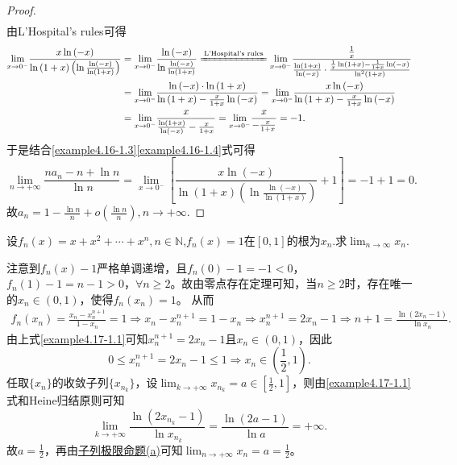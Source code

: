 \documentclass[../../main.tex]{subfiles}
\begin{document}
\begin{proof}
\begin{align}
\label{example4.16-1.3}
\end{align}
由L'Hospital's rules可得
\begin{align}
\underset{x\rightarrow 0^-}{\lim}\frac{x\ln \left( -x \right)}{\ln \left( 1+x \right) \left( \ln \frac{\ln \left( -x \right)}{\ln \left( 1+x \right)} \right)}&=\underset{x\rightarrow 0^-}{\lim}\frac{\ln \left( -x \right)}{\ln \frac{\ln \left( -x \right)}{\ln \left( 1+x \right)}}\xlongequal{\text{L'Hospital's rules}}\underset{x\rightarrow 0^-}{\lim}\frac{\frac{1}{x}}{\frac{\ln \left( 1+x \right)}{\ln \left( -x \right)}\cdot \frac{\frac{1}{x}\ln \left( 1+x \right) -\frac{1}{1+x}\ln \left( -x \right)}{\ln ^2\left( 1+x \right)}}\nonumber
\\
&=\underset{x\rightarrow 0^-}{\lim}\frac{\ln \left( -x \right) \cdot \ln \left( 1+x \right)}{\ln \left( 1+x \right) -\frac{x}{1+x}\ln \left( -x \right)}=\underset{x\rightarrow 0^-}{\lim}\frac{x\ln \left( -x \right)}{\ln \left( 1+x \right) -\frac{x}{1+x}\ln \left( -x \right)}\nonumber
\\
&=\underset{x\rightarrow 0^-}{\lim}\frac{x}{\frac{\ln \left( 1+x \right)}{\ln \left( -x \right)}-\frac{x}{1+x}}=\underset{x\rightarrow 0^-}{\lim}\frac{x}{-\frac{x}{1+x}}=-1.
\label{example4.16-1.4}
\end{align}
于是结合\eqref{example4.16-1.3}\eqref{example4.16-1.4}式可得
\[
\lim_{n\rightarrow +\infty}\frac{na_n - n + \ln n}{\ln n} = \lim_{x\rightarrow 0^-}\left[ \frac{x\ln(-x)}{\ln(1 + x)\left(\ln \frac{\ln(-x)}{\ln(1 + x)}\right)} + 1 \right] = -1 + 1 = 0.
\]
故\(a_n = 1 - \frac{\ln n}{n} + o\left(\frac{\ln n}{n}\right), n \rightarrow +\infty\).
\end{proof}

\begin{example}
设\(f_n(x)=x + x^2+\cdots+x^n,n\in\mathbb{N}\),\(f_n(x)=1\)在\([0,1]\)的根为\(x_n\).求\(\lim_{n\rightarrow\infty}x_n\).
\end{example}
\begin{solution}
注意到\(f_n(x) - 1\)严格单调递增，且\(f_n(0) - 1 = -1 < 0\)，\(f_n(1) - 1 = n - 1 > 0\)，\(\forall n\geqslant 2\)。故由零点存在定理可知，当\(n\geqslant 2\)时，存在唯一的\(x_n\in(0, 1)\)，使得\(f_n(x_n) = 1\)。
从而
\begin{align}\label{example4.17-1.1}
f_n(x_n)=\frac{x_n - x_{n}^{n + 1}}{1 - x_n}=1\Rightarrow x_n - x_{n}^{n + 1}=1 - x_n\Rightarrow x_{n}^{n + 1}=2x_n - 1\Rightarrow n + 1=\frac{\ln(2x_n - 1)}{\ln x_n}.  
\end{align}
由上式\eqref{example4.17-1.1}可知\(x_{n}^{n + 1}=2x_n - 1\)且\(x_n\in(0, 1)\)，因此
\[
0\leqslant x_{n}^{n + 1}=2x_n - 1\leqslant 1\Rightarrow x_n\in\left(\frac{1}{2}, 1\right).
\]
任取\(\{x_n\}\)的收敛子列\(\{x_{n_k}\}\)，设\(\lim_{k\rightarrow +\infty}x_{n_k}=a\in\left[\frac{1}{2}, 1\right]\)，则由\eqref{example4.17-1.1}式和Heine归结原则可知
\[
\lim_{k\rightarrow +\infty}\frac{\ln(2x_{n_k} - 1)}{\ln x_{n_k}}=\frac{\ln(2a - 1)}{\ln a}=+\infty.
\]
故\(a = \frac{1}{2}\)，再由\hyperref[proposition:子列极限命题]{子列极限命题(a)}可知\(\lim_{n\rightarrow +\infty}x_n=a=\frac{1}{2}\)。
\end{solution}
\end{document}
